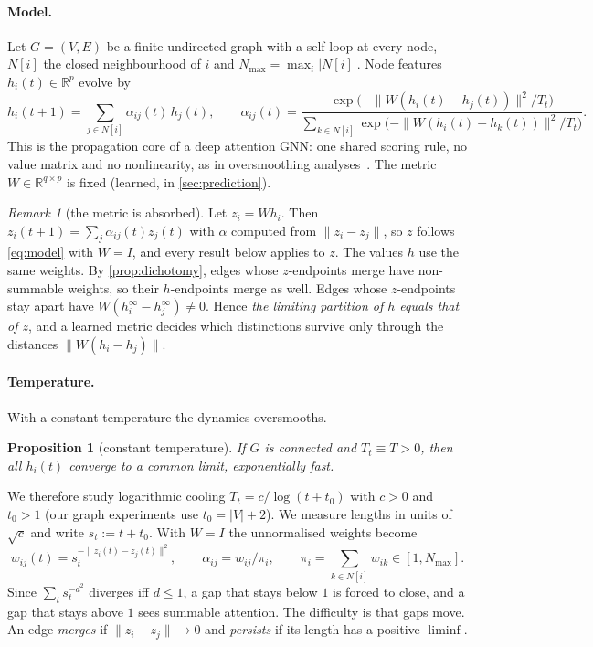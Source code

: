 \documentclass[10pt]{article}
\newtheorem{proposition}{Proposition}
\theoremstyle{definition}
\theoremstyle{remark}
\newtheorem{remark}{Remark}
\newcommand{\R}{\mathbb{R}}
\newcommand{\Nmax}{N_{\max}}
\begin{document}
\paragraph{Model.} Let $G=(V,E)$ be a finite undirected graph with a self-loop at every node, $N[i]$ the closed neighbourhood of
$i$ and $\Nmax=\max_i|N[i]|$. Node features $h_i(t)\in\R^p$ evolve by
\begin{equation}\label{eq:model}
h_i(t+1)=\sum_{j\in N[i]}\alpha_{ij}(t)\,h_j(t),\qquad
\alpha_{ij}(t)=\frac{\exp\big(-\|W(h_i(t)-h_j(t))\|^2/T_t\big)}{\sum_{k\in N[i]}\exp\big(-\|W(h_i(t)-h_k(t))\|^2/T_t\big)} .
\end{equation}
This is the propagation core of a deep attention GNN: one shared scoring rule, no value matrix and no nonlinearity, as in
oversmoothing analyses~\citep{wu2023,geshkovski2023}. The metric $W\in\R^{q\times p}$ is fixed (learned, in \cref{sec:prediction}).

\begin{remark}[the metric is absorbed]\label{rem:metric}
Let $z_i=Wh_i$. Then $z_i(t+1)=\sum_j\alpha_{ij}(t)z_j(t)$ with $\alpha$ computed from $\|z_i-z_j\|$, so $z$ follows
\eqref{eq:model} with $W=I$, and every result below applies to $z$. The values $h$ use the same weights. By
\cref{prop:dichotomy}, edges whose $z$-endpoints merge have non-summable weights, so their $h$-endpoints merge as well. Edges whose
$z$-endpoints stay apart have $W(h_i^\infty-h_j^\infty)\ne0$. Hence \emph{the limiting partition of $h$ equals that of $z$}, and a
learned metric decides which distinctions survive only through the distances $\|W(h_i-h_j)\|$.
\end{remark}

\paragraph{Temperature.} With a constant temperature the dynamics oversmooths.

\begin{proposition}[constant temperature]\label{prop:constT}
If $G$ is connected and $T_t\equiv T>0$, then all $h_i(t)$ converge to a common limit, exponentially fast.
\end{proposition}

We therefore study logarithmic cooling $T_t=c/\log(t+t_0)$ with $c>0$ and $t_0>1$ (our graph experiments use $t_0=|V|+2$). We
measure lengths in units of $\sqrt c$ and write $s_t:=t+t_0$. With $W=I$ the unnormalised weights become
\begin{equation}\label{eq:weights}
w_{ij}(t)=s_t^{-\|z_i(t)-z_j(t)\|^2},\qquad \alpha_{ij}=w_{ij}/\pi_i,\qquad \pi_i=\sum_{k\in N[i]}w_{ik}\in[1,\Nmax].
\end{equation}
Since $\sum_t s_t^{-d^2}$ diverges iff $d\le1$, a gap that stays below $1$ is forced to close, and a gap that stays above $1$ sees
summable attention. The difficulty is that gaps move. An edge \emph{merges} if $\|z_i-z_j\|\to0$ and \emph{persists} if its
length has a positive $\liminf$.
\end{document}
